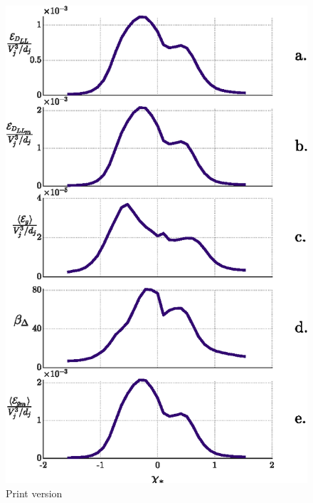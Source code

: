 \documentclass{article}
\begin{document}
\begin{figure}
    \centering
    \includegraphics{figs/PG_4Hz_Diss_Splots_2.eps}
    \caption{Print version}
    \label{dissPlots2}
\end{figure}
\end{document}
